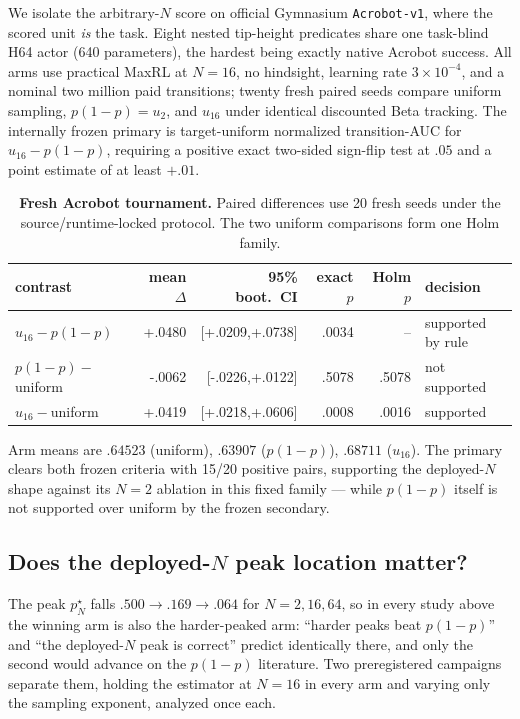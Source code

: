 We isolate the arbitrary-$N$ score on official Gymnasium
\texttt{Acrobot-v1}, where the scored unit \emph{is} the task. Eight nested
tip-height predicates share one task-blind H64 actor (640 parameters), the
hardest being exactly native Acrobot success. All arms use practical MaxRL at
$N=16$, no hindsight, learning rate $3\times10^{-4}$, and a nominal two
million paid transitions; twenty fresh paired seeds compare uniform sampling,
$p(1-p)=u_2$, and $u_{16}$ under identical discounted Beta tracking. The
internally frozen primary is target-uniform normalized transition-AUC for
$u_{16}-p(1-p)$, requiring a positive exact two-sided sign-flip test at $.05$
and a point estimate of at least $+.01$.

\begin{table}[ht]
\centering
\scriptsize
\setlength{\tabcolsep}{3.2pt}
\caption{\textbf{Fresh Acrobot tournament.} Paired differences use 20 fresh
seeds under the source/runtime-locked protocol. The two uniform comparisons
form one Holm family.}
\label{tab:acrobot}
\begin{tabular}{@{}lrrrrl@{}}
\toprule
contrast & mean $\Delta$ & 95\% boot.\ CI & exact $p$ & Holm $p$ & decision\\
\midrule
$u_{16}-p(1-p)$ & +.0480 & [+.0209,+.0738] & .0034 & -- & supported by rule\\
$p(1-p)-$uniform & -.0062 & [-.0226,+.0122] & .5078 & .5078 & not supported\\
$u_{16}-$uniform & +.0419 & [+.0218,+.0606] & .0008 & .0016 & supported\\
\bottomrule
\end{tabular}
\end{table}

Arm means are $.64523$ (uniform), $.63907$ ($p(1-p)$), $.68711$ ($u_{16}$).
The primary clears both frozen criteria with 15/20 positive pairs, supporting
the deployed-$N$ shape against its $N{=}2$ ablation in this fixed family ---
while $p(1-p)$ itself is not supported over uniform by the frozen secondary.

\subsection{Does the deployed-$N$ peak location matter?}
\label{sec:peaktest}

The peak $p^\star_N$ falls $.500\to.169\to.064$ for $N=2,16,64$, so in every
study above the winning arm is also the harder-peaked arm: ``harder peaks beat
$p(1-p)$'' and ``the deployed-$N$ peak is correct'' predict identically there,
and only the second would advance on the $p(1-p)$ literature. Two preregistered
campaigns separate them, holding the estimator at $N=16$ in every arm and
varying only the sampling exponent, analyzed once each.

